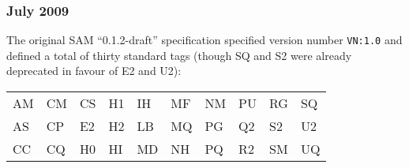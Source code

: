\documentclass[10pt]{article}
\begin{document}
\begin{appendices}
\subsubsection*{July 2009}

\begin{samepage}
The original SAM ``0.1.2-draft'' specification specified version number {\tt VN:1.0} and defined a total of thirty standard tags (though SQ and S2 were already deprecated in favour of E2 and U2):

\begin{center}
\begin{tabular}{l*{9}{@{\qquad}l}}
AM & CM & CS & H1 & IH & MF & NM & PU & RG & SQ \\
AS & CP & E2 & H2 & LB & MQ & PG & Q2 & S2 & U2 \\
CC & CQ & H0 & HI & MD & NH & PQ & R2 & SM & UQ
\end{tabular}
\end{center}
\end{samepage}

\end{appendices}
\end{document}
